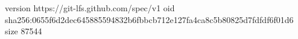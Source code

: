 version https://git-lfs.github.com/spec/v1
oid sha256:0655f6d2dec645885594832b6fbbcb712e127fa4ca8c5b80825d7fdfdf6f01d6
size 87544

